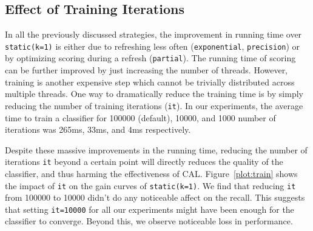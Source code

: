 \subsection*{Effect of Training Iterations}

In all the previously discussed strategies, the improvement in running time over
\texttt{static(k=1)} is either due to refreshing less often (\texttt{exponential},
\texttt{precision}) or by optimizing scoring during a refresh
(\texttt{partial}). The running time of scoring can be further improved by just
increasing the number of threads. However, training is another expensive step
which cannot be trivially distributed across multiple threads. One way to
dramatically reduce the training time is by simply reducing the number of
training iterations (\texttt{it}). In our experiments, the average time to train a classifier
for 100000 (default), 10000, and 1000 number of iterations was 265ms, 33ms, and
4ms respectively.

Despite these massive improvements in the running time, reducing the number of
iterations \texttt{it} beyond a certain point will directly
reduces the quality of the classifier, and thus harming the effectiveness of
CAL. Figure~\ref{plot:train} shows the impact of \texttt{it} on the gain curves
of \texttt{static(k=1)}. We find that reducing \texttt{it} from 100000 to 10000
didn't do any noticeable affect on the recall. This suggests that setting
\texttt{it=10000} for all our experiments might have been enough for the
classifier to converge. Beyond this, we observe noticeable loss in performance.

